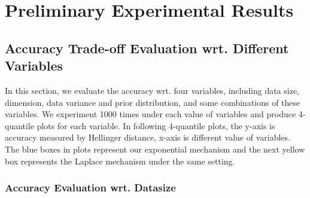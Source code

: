 \documentclass[sigconf, anonymous]{acmart}
\begin{document}



\section{Preliminary Experimental Results}
\label{sec_experiment}


\subsection{Accuracy Trade-off Evaluation wrt. Different Variables}
\label{subsec_vs_variables}

In this section, we evaluate the accuracy wrt. four variables, including data size, dimension, data variance and prior distribution, and some combinations of these variables. We experiment 1000 times under each value of variables and produce 4-quantile plots for each variable. In following 4-quantile plots, the y-axis is accuracy measured by Hellinger distance, x-axis is different value of variables. The blue boxes in plots represent our exponential mechanism and the next yellow box represents the Laplace mechanism under the same setting.

\subsubsection{Accuracy Evaluation wrt. Datasize}
\label{subsubsec_vs_datasize}
\end{document}
